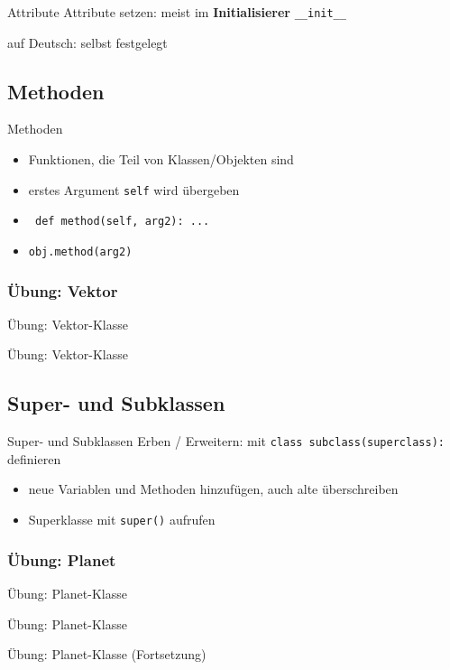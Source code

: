 \begin{frame}{Attribute}
	Attribute setzen: meist im \textbf{Initialisierer} \alert{\tt \_\_init\_\_}
	
    auf Deutsch: selbst festgelegt
\end{frame}

\subsection{Methoden}
\begin{frame}{Methoden}
	\begin{itemize}
		\item Funktionen, die Teil von Klassen/Objekten sind
		\item<2-> erstes Argument \texttt{self} wird übergeben
        \item<3-> \texttt{    def method(self, arg2): ...}
        \item<3-> \texttt{obj.method(arg2)}
	\end{itemize}
\end{frame}

\subsubsection{Übung: Vektor}
\begin{frame}{Übung: Vektor-Klasse}
    
\end{frame}
\begin{frame}{Übung: Vektor-Klasse}
    
\end{frame}

\subsection{Super- und Subklassen}
\begin{frame}{Super- und Subklassen}
	Erben / Erweitern: mit \alert{\tt class subclass(superclass):} definieren
	\begin{itemize}
		\item neue Variablen und Methoden hinzufügen, auch alte überschreiben
		\item Superklasse mit \alert{\tt super()} aufrufen
    \end{itemize}
	
\end{frame}
\subsubsection{Übung: Planet}
\begin{frame}{Übung: Planet-Klasse}
    
\end{frame}
\begin{frame}{Übung: Planet-Klasse}
    
\end{frame}
\begin{frame}{Übung: Planet-Klasse (Fortsetzung)}
    
\end{frame}


